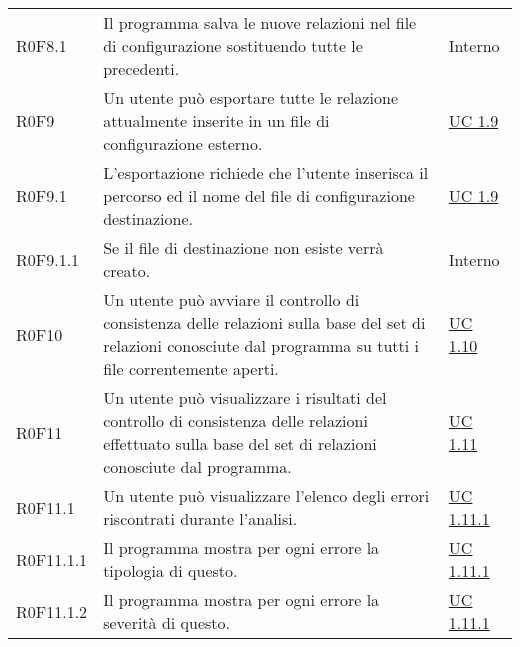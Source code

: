 \begin{center}
\begin{longtable}{p{4.2cm}!{\color{white}\vrule width 0.5mm}p{6cm}!{\color{white}\vrule width 0.5mm}p{2.5cm}!{\color{white}\vrule width 0.5mm}}
			\hspace{2mm}\hypertarget{XER0F8.1}{R0F8.1} & Il programma salva le nuove relazioni nel file di configurazione sostituendo tutte le precedenti. & Interno\\
			
		
		\hspace{0mm}\hypertarget{XER0F9}{R0F9} & Un utente può esportare tutte le relazione attualmente inserite in un file di configurazione esterno. & \hyperref[subsec:XEUC1.9]{UC 1.9}\\
			\hspace{2mm}\hypertarget{XER0F9.1}{R0F9.1} & L'esportazione richiede che l'utente inserisca il percorso ed il nome del file di configurazione destinazione. & \hyperref[subsec:XEUC1.9]{UC 1.9}\\
			
				\hspace{2mm}\hypertarget{XER0F9.1.1}{R0F9.1.1} & Se il file di destinazione non esiste verrà creato. & Interno\\
		
		
		\hspace{0mm}\hypertarget{XER0F10}{R0F10} & Un utente può avviare il controllo di consistenza delle relazioni sulla base del set di relazioni conosciute dal programma su tutti i file correntemente aperti. & \hyperref[subsec:XEUC1.10]{UC 1.10}\\
			
		\hspace{0mm}\hypertarget{XER0F11}{R0F11} & Un utente può visualizzare i risultati del controllo di consistenza delle relazioni effettuato sulla base del set di relazioni conosciute dal programma. & \hyperref[subsec:XEUC1.11]{UC 1.11}\\
			
			\hspace{2mm}\hypertarget{XER0F11.1}{R0F11.1} & Un utente può visualizzare l'elenco degli errori riscontrati durante l'analisi. & \hyperref[subsec:XEUC1.11.1]{UC 1.11.1}\\
			
				\hspace{4mm}\hypertarget{XER0F11.1.1}{R0F11.1.1} & Il programma mostra per ogni errore la tipologia di questo. & \hyperref[subsec:XEUC1.11.1]{UC 1.11.1}\\
				
				\hspace{4mm}\hypertarget{XER0F11.1.2}{R0F11.1.2} & Il programma mostra per ogni errore la severità di questo. & \hyperref[subsec:XEUC1.11.1]{UC 1.11.1}\\
				

\end{longtable}
\end{center}
